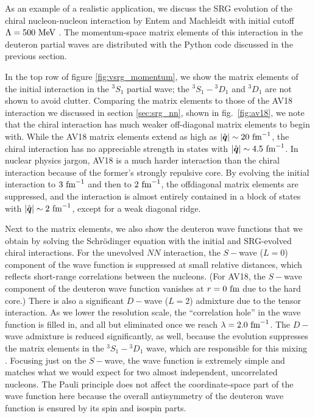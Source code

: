As an example of a realistic application, we discuss the SRG evolution of the
chiral \NNNLO{} nucleon-nucleon interaction by Entem and Machleidt with initial 
cutoff $\Lambda=500\,\,\text{MeV}$ \cite{Entem:2003th,Machleidt:2011bh}. The momentum-space
matrix elements of this interaction in the deuteron partial waves are distributed
with the Python code discussed in the previous section.

In the top row of figure \ref{fig:vsrg_momentum}, we show the matrix elements
of the initial interaction in the ${}^3S_1$ partial wave; the ${}^3S_1-{}^3D_1$
and ${}^3D_1$ are not shown to avoid clutter. Comparing the matrix elements to
those of the AV18 interaction we discussed in section \ref{sec:srg_nn}, shown
in fig.~\ref{fig:av18}, we note that the chiral interaction has much weaker
off-diagonal matrix elements to begin with. While the AV18 matrix elements
extend as high as $|\qOV|\sim 20\,\fmi$, the chiral interaction has no appreciable
strength in states with $|\qOV|\sim 4.5\,\fmi$. In nuclear physics jargon, 
AV18 is a much harder interaction than the chiral interaction because of 
the former's strongly repulsive core. By evolving the initial interaction
to $3\,\,\text{fm}^{-1}$ and then to $2\,\,\text{fm}^{-1}$, the offdiagonal matrix elements are 
suppressed, and the interaction is almost entirely contained in a block
of states with $|\qOV|\sim 2\,\fmi$, except for a weak diagonal ridge.

Next to the matrix elements, we also show the deuteron wave functions
that we obtain by solving the Schr\"odinger equation with the initial
and SRG-evolved chiral interactions. For the unevolved $NN$ interaction,
the $S-$wave ($L=0$) component of the wave function is 
suppressed at small relative distances, which reflects short-range 
correlations between the nucleons. (For AV18, the $S-$wave component of 
the deuteron wave function vanishes at $r=0\,\,\text{fm}$ due to the hard core.)
There is also a significant $D-$wave ($L=2$) admixture due to the tensor interaction.
As we lower the resolution scale, the ``correlation hole'' in the wave
function is filled in, and all but eliminated once we reach 
$\lambda=2.0\,\,\text{fm}^{-1}$. The $D-$wave admixture is reduced significantly,
as well, because the evolution suppresses the 
matrix elements in the ${}^3S_1-{}^3D_1$ wave, which are responsible
for this mixing \cite{Bogner:2010pq}. Focusing just on the $S-$wave,
the wave function is extremely simple and matches what we would expect
for two almost independent, uncorrelated nucleons. The Pauli principle
does not affect the coordinate-space part of the wave function here 
because the overall antisymmetry of the deuteron wave function is ensured 
by its spin and isospin parts.

